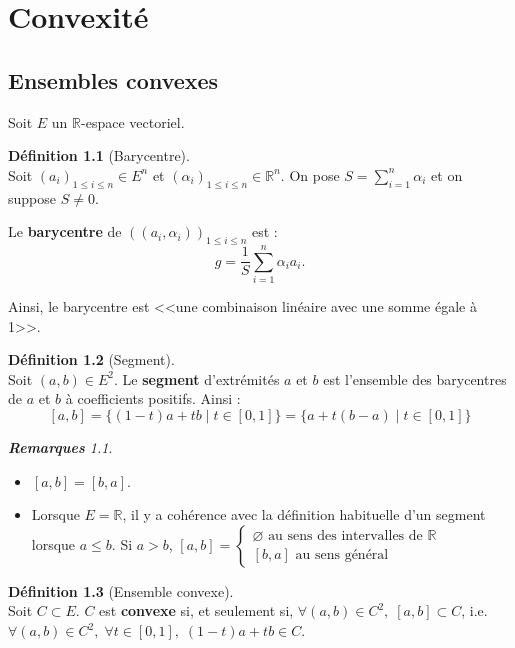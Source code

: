 \documentclass[12pt]{book}
\let\ensembleNombre\mathbb
\newcommand*\R{\ensuremath{\ensembleNombre{R}}}
\theoremstyle{definition}
\newtheorem*{defi}{Définition}
\theoremstyle{remark}
\newtheorem*{rems}{\textbf{Remarques}}
\newenvironment{fdef}
  {\begin{mdframed}[roundcorner=10pt, linewidth=1pt]\begin{defi}}
  {\end{defi}\end{mdframed}}
\begin{document}
\chapter{Convexité}
	\section{Ensembles convexes}
	Soit $E$ un $\R$-espace vectoriel.
	
	\begin{fdef}[Barycentre]\mbox{~}\\
	Soit $(a_i)_{1 \leq i \leq n} \in E^n$ et $(\alpha_i)_{1 \leq i \leq n} \in \R^n$. On pose $S = \sum_{i=1}^n \alpha_i$ et on suppose $S \neq 0$. 
	
	\noindent Le \textbf{barycentre} de $((a_i, \alpha_i))_{1 \leq i \leq n}$ est : 
	\[\boxed{ g = \frac{1}{S} \sum_{i=1}^n \alpha_i a_i.}\]
	
	Ainsi, le barycentre est <<une combinaison linéaire avec une somme égale à 1>>.
	\end{fdef}	
	
	\begin{fdef}[Segment] \mbox{~}\\
	Soit $(a,b) \in E^2$. Le \textbf{segment} d'extrémités $a$ et $b$ est l'ensemble des barycentres de $a$ et $b$ à coefficients positifs. Ainsi : 
	\[ \boxed{[a,b] = \lbrace (1-t)a + tb \;|\; t \in [0,1]\rbrace} = \lbrace a + t(b-a) \;|\; t\in [0,1] \rbrace\]
	\end{fdef}
	
	\begin{rems}\mbox{~}\\
	\begin{itemize}
	\item $[a,b] = [b,a]$.
	\item Lorsque $E = \R$, il y a cohérence avec la définition habituelle d'un segment lorsque $a \leq b$. Si $a > b$, $[a,b] = \begin{cases} 
						 \varnothing \text{ au sens des intervalles de } \R \\
						 [b,a] \text{ au sens général}
						 \end{cases}$
	\end{itemize}
	\end{rems} \newpage
	
	\begin{fdef}[Ensemble convexe]\mbox{~}\\
	Soit $C \subset E$. $C$ est \textbf{convexe} si, et seulement si, $\forall (a,b)\in C^2,\; [a,b] \subset C$, i.e. $\forall (a,b) \in C^2,\; \forall t \in [0,1],\; (1-t)a + tb \in C$.
	\end{fdef}
	
\end{document}
